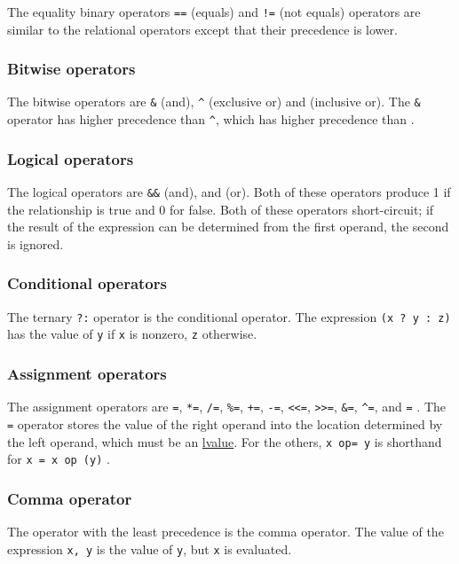 The equality binary operators \texttt{==} (equals) and \texttt{!=} (not equals)
operators are similar to the relational operators except that their precedence
is lower.

\subsubsection{Bitwise operators}
The bitwise operators are \texttt{\&} (and), \texttt{\^{}} (exclusive or) and
\texttt{\textbar{}} (inclusive or). The \texttt{\&} operator has higher
precedence than \texttt{\^{}}, which has higher precedence than
\texttt{\textbar{}}.

\subsubsection{Logical operators}
The logical operators are \texttt{\&\&} (and), and
\texttt{\textbar{}\textbar{}} (or). Both of these operators produce 1 if the
relationship is true and 0 for false. Both of these operators short-circuit; if
the result of the expression can be determined from the first operand, the
second is ignored.

\subsubsection{Conditional operators}
The ternary \texttt{?:} operator is the conditional operator. The expression
\texttt{(x ? y : z)} has the value of \texttt{y} if \texttt{x} is nonzero,
\texttt{z} otherwise.

\subsubsection{Assignment operators}
The assignment operators are \texttt{=}, \texttt{*=}, \texttt{/=},
\texttt{\%=}, \texttt{+=}, \texttt{-=}, \texttt{\textless{}\textless{}=},
\texttt{\textgreater{}\textgreater{}=}, \texttt{\&=}, \texttt{\^{}=}, and
\texttt{\textbar{}=} . The \texttt{=} operator stores the value of the right
operand into the location determined by the left operand, which must be an
\href{http://en.wikibooks.org.org/wiki/lvalue}{lvalue}. For the others,
\texttt{x op= y} is shorthand for \texttt{x = x op (y)} .

\subsubsection{Comma operator}
The operator with the least precedence is the comma operator. The value of the
expression \texttt{x, y} is the value of \texttt{y}, but \texttt{x} is
evaluated.
